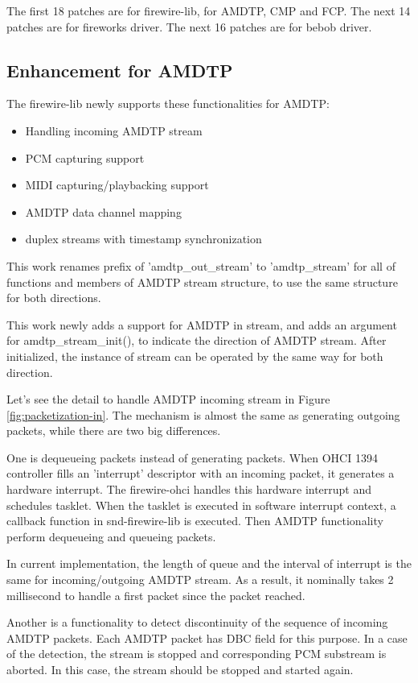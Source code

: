 \documentclass[onecolumn]{article}
\begin{document}
The first 18 patches are for firewire-lib, for AMDTP, CMP and FCP. The next 14 patches are for fireworks driver. The next 16 patches are for bebob driver.

\subsection{Enhancement for AMDTP}

The firewire-lib newly supports these functionalities for AMDTP:

\begin{itemize}
	\item Handling incoming AMDTP stream
	\item PCM capturing support
	\item MIDI capturing/playbacking support
	\item AMDTP data channel mapping
	\item duplex streams with timestamp synchronization
\end{itemize}

This work renames prefix of 'amdtp\_out\_stream' to 'amdtp\_stream' for all of functions and members of AMDTP stream structure, to use the same structure for both directions.

This work newly adds a support for AMDTP in stream, and adds an argument for amdtp\_stream\_init(), to indicate the direction of AMDTP stream. After initialized, the instance of stream can be operated by the same way for both direction.

Let's see the detail to handle AMDTP incoming stream in Figure \ref{fig:packetization-in}. The mechanism is almost the same as generating outgoing packets, while there are two big differences.

One is dequeueing packets instead of generating packets. When OHCI 1394 controller fills an 'interrupt' descriptor with an incoming packet, it generates a hardware interrupt. The firewire-ohci handles this hardware interrupt and schedules tasklet. When the tasklet is executed in software interrupt context, a callback function in snd-firewire-lib is executed. Then AMDTP functionality perform dequeueing and queueing packets.

In current implementation, the length of queue and the interval of interrupt is the same for incoming/outgoing AMDTP stream. As a result, it nominally takes 2 millisecond to handle a first packet since the packet reached.

Another is a functionality to detect discontinuity of the sequence of incoming AMDTP packets. Each AMDTP packet has DBC field for this purpose. In a case of the detection, the stream is stopped and corresponding PCM substream is aborted. In this case, the stream should be stopped and started again.
\end{document}
